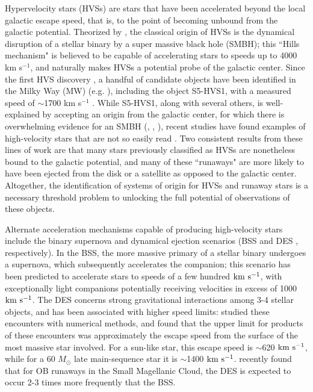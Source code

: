 \documentclass[twocolumn,linenumbers]{aastex631}
\newcommand{\kms}{${\rm km~s^{-1}}$}
\begin{document}
Hypervelocity stars (HVSs) are stars that have been accelerated beyond the local galactic escape speed, that is, to the point of becoming unbound from the galactic potential.
Theorized by \citealt{1988Natur.331..687H}, the classical origin of HVSs is the dynamical disruption of a stellar binary by a super massive black hole (SMBH); this ``Hills mechanism" is believed to be capable of accelerating stars to speeds up to 4000 km s$^{-1}$, and naturally makes HVSs a potential probe of the galactic center.
Since the first HVS discovery \citep{2005ApJ...622L..33B}, a handful of candidate objects have been identified in the Milky Way (MW) (e.g. \citealt{2014ApJ...787...89B}), including the object S5-HVS1, with a measured speed of $\sim$1700 km s$^{-1}$ \citep{2020MNRAS.491.2465K}.
While S5-HVS1, along with several others, is well-explained by accepting an origin from the galactic center, for which there is overwhelming evidence for an SMBH (\citealt{1998ApJ...509..678G}, \citealt{2018A&A...615L..15G}, \citealt{2022ApJ...930L..12E}), recent studies have found examples of high-velocity stars that are not so easily read \citep[e.g.][]{2018MNRAS.479.2789B, 2019MNRAS.483.2007E, 2021A&A...646L...4I}.
Two consistent results from these lines of work are that many stars previously classified as HVSs are nonetheless bound to the galactic potential, and many of these ``runaways" are more likely to have been ejected from the disk or a satellite as opposed to the galactic center.
Altogether, the identification of systems of origin for HVSs and runaway stars is a necessary threshold problem to unlocking the full potential of observations of these objects.

Alternate acceleration mechanisms capable of producing high-velocity stars include the binary supernova and dynamical ejection scenarios (BSS \citep{1961BAN....15..265B} and DES \citep{1967BOTT....4...86P}, respectively).
In the BSS, the more massive primary of a stellar binary undergoes a supernova, which subsequently accelerates the companion; this scenario has been predicted to accelerate stars to speeds of a few hundred \kms \citep{2019A&A...624A..66R, 2022MNRAS.tmp.3236I}, with exceptionally light companions potentially receiving velocities in excess of 1000 \kms \citep{2015MNRAS.448L...6T}.
The DES concerns strong gravitational interactions among 3-4 stellar objects, and has been associated with higher speed limits: \citet{1991AJ....101..562L} studied these encounters with numerical methods, and found that the upper limit for products of these encounters was approximately the escape speed from the surface of the most massive star involved.
For a sun-like star, this escape speed is $\sim$620 \kms, while for a 60 $M_\odot$ late main-sequence star it is $\sim$1400 \kms.
\citet{2023arXiv230111444O} recently found that for OB runaways in the Small Magellanic Cloud, the DES is expected to occur 2-3 times more frequently that the BSS.
\end{document}
